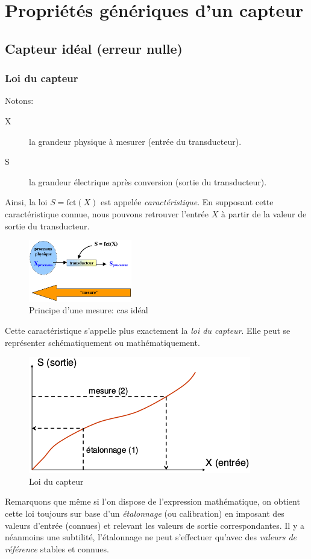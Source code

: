 \chapter{Propriétés génériques d'un capteur}
\section{Capteur idéal (erreur nulle)}
\subsection{Loi du capteur}
Notons:
\begin{description}
	\item[X] la grandeur physique à mesurer (entrée du transducteur).
	\item[S] la grandeur électrique après conversion (sortie du transducteur).
\end{description}
Ainsi, la loi \(S=\text{fct}(X)\) est appelée \emph{caractéristique}. En supposant cette caractéristique connue, nous pouvons retrouver l'entrée \(X\) à partir de la valeur de sortie du transducteur.
\begin{figure}[H] 
	\centering 
	\includegraphics[width=0.4\textwidth]{ch2/image1} 
	\caption{Principe d'une mesure: cas idéal}
\end{figure} 
Cette caractéristique s'appelle plus exactement la \emph{loi du capteur}. Elle peut se représenter schématiquement ou mathématiquement. 
\begin{figure}[H] 
	\centering 
	\includegraphics[width=.6\textwidth]{ch2/image2} 
	\caption{Loi du capteur}
\end{figure}
Remarquons que même si l'on dispose de l'expression mathématique, on obtient cette loi toujours sur base d'un \emph{étalonnage} (ou calibration) en imposant des valeurs d'entrée (connues) et relevant les valeurs de sortie correspondantes. Il y a néanmoins une subtilité, l'étalonnage ne peut s'effectuer qu'avec des \emph{valeurs de référence} stables et connues.\\

